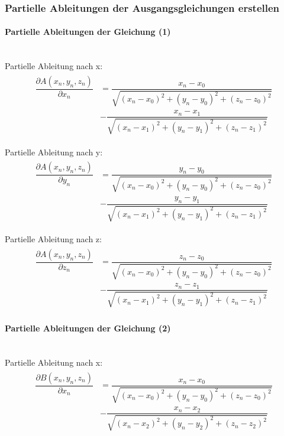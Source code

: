 \subsubsection{Partielle Ableitungen der Ausgangsgleichungen erstellen}
\paragraph{Partielle Ableitungen der Gleichung (1)}\ \\

Partielle Ableitung nach x:
\begin{align}
\begin{split}
\dfrac{\partial A(x_{n},y_{n},z_{n})}{\partial x_{n}} &= \dfrac{x_{n}-x_{0}}{\sqrt{(x_{n}-x_{0})^{2}+ (y_{n}-y_{0})^{2}+(z_{n}-z_{0})^{2}}} \\ & - \dfrac{x_{n}-x_{1}}{\sqrt{(x_{n}-x_{1})^{2}+ (y_{n}-y_{1})^{2}+(z_{n}-z_{1})^{2}}}
\end{split}
\end{align}

Partielle Ableitung nach y:
\begin{align}
\begin{split}
\dfrac{\partial A(x_{n},y_{n},z_{n})}{\partial y_{n}} &= \dfrac{y_{n}-y_{0}}{\sqrt{(x_{n}-x_{0})^{2}+ (y_{n}-y_{0})^{2}+(z_{n}-z_{0})^{2}}} \\ & - \dfrac{y_{n}-y_{1}}{\sqrt{(x_{n}-x_{1})^{2}+ (y_{n}-y_{1})^{2}+(z_{n}-z_{1})^{2}}}
\end{split}
\end{align}

Partielle Ableitung nach z:
\begin{align}
\begin{split}
\dfrac{\partial A(x_{n},y_{n},z_{n})}{\partial z_{n}} &= \dfrac{z_{n}-z_{0}}{\sqrt{(x_{n}-x_{0})^{2}+ (y_{n}-y_{0})^{2}+(z_{n}-z_{0})^{2}}} \\ & - \dfrac{z_{n}-z_{1}}{\sqrt{(x_{n}-x_{1})^{2}+ (y_{n}-y_{1})^{2}+(z_{n}-z_{1})^{2}}}
\end{split}
\end{align}
\paragraph{Partielle Ableitungen der Gleichung (2)}\ \\
Partielle Ableitung nach x:
\begin{align}
\begin{split}
\dfrac{\partial B(x_{n},y_{n},z_{n})}{\partial x_{n}} &= \dfrac{x_{n}-x_{0}}{\sqrt{(x_{n}-x_{0})^{2}+ (y_{n}-y_{0})^{2}+(z_{n}-z_{0})^{2}}} \\ & - \dfrac{x_{n}-x_{2}}{\sqrt{(x_{n}-x_{2})^{2}+ (y_{n}-y_{2})^{2}+(z_{n}-z_{2})^{2}}}
\end{split}
\end{align}

